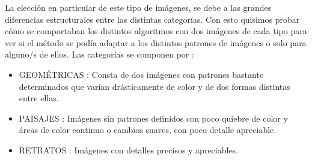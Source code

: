 \documentclass{article}
\begin{document}
La elección en particular de este tipo de imágenes, se debe a las grandes diferencias estructurales entre las distintas categorías. Con esto quisimos probar cómo se comportaban los distintos algoritmos con dos imágenes de cada tipo para ver si el método se podía adaptar a los distintos patrones de imágenes o solo para alguno$/$s de ellos. Las categorías se componen por : 
\begin{itemize}
\item GEOMÉTRICAS : Consta de dos imágenes con patrones bastante determinados que varían drásticamente de color y de dos formas distintas entre ellas.
\item PAISAJES : Imágenes sin patrones definidos con poco quiebre de color y áreas de color continuo o cambios suaves, con poco detalle apreciable. 
\item RETRATOS : Imágenes con detalles precisos y apreciables. 
\end{itemize}
\end{document}
